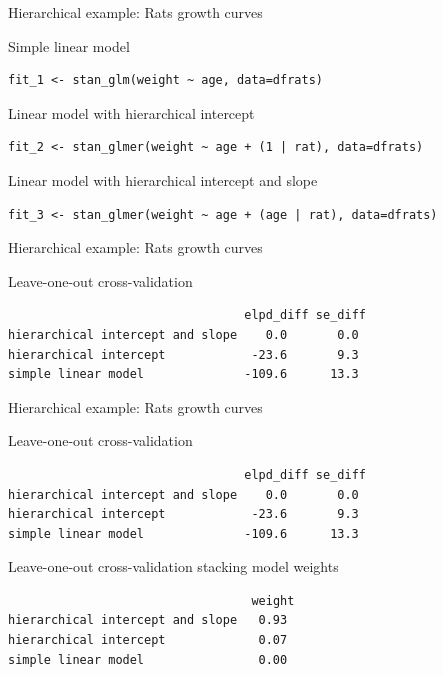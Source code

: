 \documentclass[english,t]{beamer}
\begin{document}
\begin{frame}[fragile]

  {\Large\color{navyblue} Hierarchical example: Rats growth curves}

Simple linear model
{\footnotesize
\begin{lstlisting}
fit_1 <- stan_glm(weight ~ age, data=dfrats)
\end{lstlisting}
}

Linear model with hierarchical intercept
{\footnotesize
\begin{lstlisting}
fit_2 <- stan_glmer(weight ~ age + (1 | rat), data=dfrats)
\end{lstlisting}
}

 Linear model with hierarchical intercept and slope
{\footnotesize
\begin{lstlisting}
fit_3 <- stan_glmer(weight ~ age + (age | rat), data=dfrats)
\end{lstlisting}
}

\end{frame}

\begin{frame}[fragile]

  {\Large\color{navyblue} Hierarchical example: Rats growth curves}

Leave-one-out cross-validation
{\footnotesize
\begin{lstlisting}
                                 elpd_diff se_diff
hierarchical intercept and slope    0.0       0.0 
hierarchical intercept            -23.6       9.3 
simple linear model              -109.6      13.3 
\end{lstlisting}
}


\end{frame}

\begin{frame}[fragile]

  {\Large\color{navyblue} Hierarchical example: Rats growth curves}

Leave-one-out cross-validation
{\footnotesize
\begin{lstlisting}
                                 elpd_diff se_diff
hierarchical intercept and slope    0.0       0.0 
hierarchical intercept            -23.6       9.3 
simple linear model              -109.6      13.3 
\end{lstlisting}
}

Leave-one-out cross-validation stacking model weights
{\footnotesize
\begin{lstlisting}
                                  weight
hierarchical intercept and slope   0.93
hierarchical intercept             0.07 
simple linear model                0.00
\end{lstlisting}
}

\end{frame}
\end{document}

